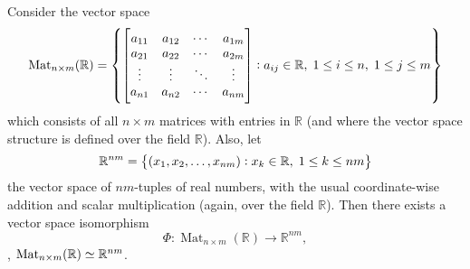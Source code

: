 \documentclass[11pt,openany]{article}
\begin{document}
\begin{example*}
	Consider the vector space \[
	\text{Mat}_{n\times m}(\mathbb{R})=\set{\begin{bmatrix}
			a_{11} & a_{12} & \cdots & a_{1m} \\
			a_{21} & a_{22} & \cdots & a_{2m} \\
			\vdots & \vdots & \ddots & \vdots \\
			a_{n1} & a_{n2} & \cdots & a_{nm}
		\end{bmatrix}: a_{ij}\in\mathbb{R},\; 1\leq i\leq n,\; 1\leq j\leq m}
	\] which consists of all \( n \times m \) matrices with entries in \(\mathbb{R}\) (and where the vector space structure is defined over the field \(\mathbb{R}\)). Also, let \[
	\mathbb{R}^{nm}=\set{(x_1,x_2,\dots,x_{nm}):x_k\in \mathbb{R},\; 1\leq k\leq nm}
	\] the vector space of \( nm \)-tuples of real numbers, with the usual coordinate-wise addition and scalar multiplication (again, over the field \(\mathbb{R}\)). Then there exists a vector space isomorphism \[
	\Phi : \operatorname{Mat}_{n \times m}(\mathbb{R}) \to \mathbb{R}^{nm},
	\] \ie, $\text{Mat}_{n\times m}(\mathbb{R})\simeq \mathbb{R}^{nm}$.
%
%
%
%
%
%
%

\end{example*}
\end{document}
